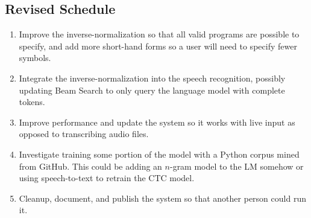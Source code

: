 \documentclass{article}
\begin{document}
\subsection{Revised Schedule}
\begin{enumerate}
    \item Improve the inverse-normalization so that all valid programs are possible to specify, and add more short-hand forms so a user will need to specify fewer symbols.
    \item Integrate the inverse-normalization into the speech recognition, possibly updating Beam Search to only query the language model with complete tokens.
    \item Improve performance and update the system so it works with live input as opposed to transcribing audio files.
    \item Investigate training some portion of the model with a Python corpus mined from GitHub. This could be adding an $n$-gram model to the LM somehow or using speech-to-text to retrain the CTC model.
    \item Cleanup, document, and publish the system so that another person could run it.
\end{enumerate}



\end{document}
